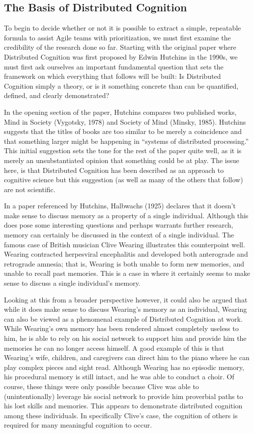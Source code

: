 \subsection{The Basis of Distributed Cognition}
To begin to decide whether or not it is possible to extract a simple, repeatable formula to assist Agile teams with prioritization, we must first examine the credibility of the research done so far. Starting with the original paper where Distributed Cognition was first proposed by Edwin Hutchins in the 1990s, we must first ask ourselves an important fundamental question that sets the framework on which everything that follows will be built: Is Distributed Cognition simply a theory, or is it something concrete than can be quantified, defined, and clearly demonstrated?

In the opening section of the paper, Hutchins compares two published works, Mind in Society (Vygotsky, 1978) and Society of Mind (Minsky, 1985). Hutchins suggests that the titles of books are too similar to be merely a coincidence and that something larger might be happening in ``systems of distributed processing.''\cite{hutchins2000distributed} This initial suggestion sets the tone for the rest of the paper quite well, as it is merely an unsubstantiated opinion that something could be at play. The issue here, is that Distributed Cognition has been described as an approach to cognitive science but this suggestion (as well as many of the others that follow) are not scientific.

In a paper referenced by Hutchins, Halbwachs (1925) declares that it doesn't make sense to discuss memory as a property of a single individual. Although this does pose some interesting questions and perhaps warrants further research, memory can certainly be discussed in the context of a single individual. The famous case of British musician Clive Wearing illustrates this counterpoint well. Wearing contracted herpesviral encephalitis and developed both anterograde and retrograde amnesia; that is, Wearing is both unable to form new memories, and unable to recall past memories. This is a case in where it certainly seems to make sense to discuss a single individual's memory.

Looking at this from a broader perspective however, it could also be argued that while it does make sense to discuss Wearing's memory as an individual, Wearing can also be viewed as a phenomenal example of Distributed Cognition at work. While Wearing's own memory has been rendered almost completely useless to him, he is able to rely on his social network to support him and provide him the memories he can no longer access himself. A good example of this is that Wearing's wife, children, and caregivers can direct him to the piano where he can play complex pieces and sight read. Although Wearing has no episodic memory, his procedural memory is still intact, and he was able to conduct a choir. Of course, these things were only possible because Clive was able to (unintentionally) leverage his social network to provide him proverbial paths to his lost skills and memories. This appears to demonstrate distributed cognition among these individuals. In specifically Clive's case, the cognition of others is required for many meaningful cognition to occur.

